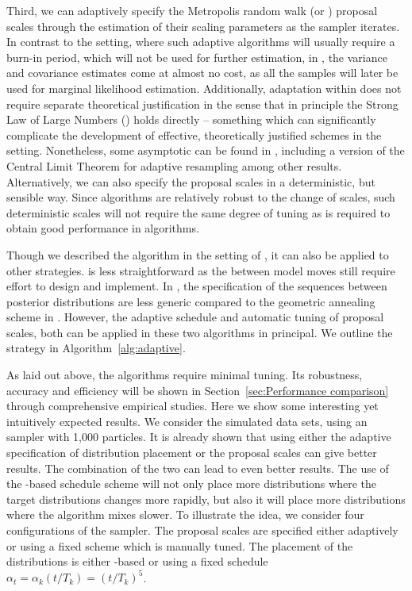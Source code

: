 Third, we can adaptively specify the Metropolis random walk (or \mala)
proposal scales through the estimation of their scaling parameters as the
sampler iterates. In contrast to the \mcmc setting, where such adaptive
algorithms will usually require a burn-in period, which will not be used for
further estimation, in \smc, the variance and covariance estimates come at
almost no cost, as all the samples will later be used for marginal likelihood
estimation. Additionally, adaptation within \smc does not require separate
theoretical justification in the sense that in principle the Strong Law of
Large Numbers (\slln) holds directly -- something which can significantly
complicate the development of effective, theoretically justified schemes in
the \mcmc setting. Nonetheless, some asymptotic can be found in
\cite{Beskos:2013vx}, including a version of the Central Limit Theorem for
adaptive resampling among other results. Alternatively, we can also specify
the proposal scales in a deterministic, but sensible way. Since \smc
algorithms are relatively robust to the change of scales, such deterministic
scales will not require the same degree of tuning as is required to obtain
good performance in \mcmc algorithms.

Though we described the algorithm in the setting of \smc[2], it can also be
applied to other \smc strategies. \smc[1] is less straightforward as the
between model moves still require effort to design and implement. In \smc[3],
the specification of the sequences between posterior distributions are less
generic compared to the geometric annealing scheme in \smc[2]. However, the
adaptive schedule and automatic tuning of \mcmc proposal scales, both can be
applied in these two algorithms in principal. We outline the strategy in
Algorithm~\ref{alg:adaptive}.



As laid out above, the algorithms require minimal tuning. Its robustness,
accuracy and efficiency will be shown in Section~\ref{sec:Performance
  comparison} through comprehensive empirical studies. Here we show some
interesting yet intuitively expected results. We consider the simulated \pet
data sets, using an \smc[2] sampler with 1,000 particles. It is already shown
that using either the adaptive specification of distribution placement or the
\mcmc proposal scales can give better results. The combination of the two can
lead to even better results. The use of the \cess-based schedule scheme will
not only place more distributions where the target distributions changes more
rapidly, but also it will place more distributions where the \mcmc algorithm
mixes slower. To illustrate the idea, we consider four configurations of the
sampler. The proposal scales are specified either adaptively or using a fixed
scheme which is manually tuned. The placement of the distributions is either
\cess-based or using a fixed schedule $\alpha_t = \alpha_k(t/T_k) =
(t/T_k)^5$.

